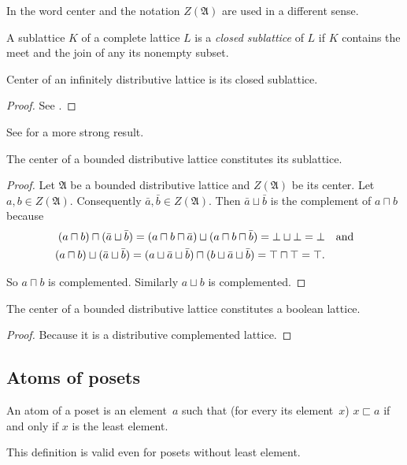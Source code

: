 \begin{rem}
In \cite{ADTCGSBVA} the word center and the notation $Z(\mathfrak{A})$
are used in a different sense.\end{rem}
\begin{defn}
A sublattice $K$ of a complete lattice
$L$ is a \emph{closed sublattice} of $L$ if $K$ contains the meet
and the join of any its nonempty subset.\end{defn}
\begin{thm}
Center of an infinitely distributive lattice is its closed sublattice.\end{thm}
\begin{proof}
See \cite{center-inf-distr}.\end{proof}
\begin{rem}
See \cite{center-complete} for a more strong result.\end{rem}
\begin{thm}
The center of a bounded distributive lattice constitutes its sublattice.\end{thm}
\begin{proof}
Let $\mathfrak{A}$ be a bounded distributive lattice and $Z(\mathfrak{A})$
be its center. Let $a,b\in Z(\mathfrak{A})$. Consequently $\bar{a},\bar{b}\in Z(\mathfrak{A})$.
Then $\bar{a}\sqcup\bar{b}$ is the complement of $a\sqcap b$ because
\begin{align*}
(a\sqcap b)\sqcap(\bar{a}\sqcup\bar{b})=(a\sqcap b\sqcap\bar{a})\sqcup(a\sqcap b\sqcap\bar{b})=\bot\sqcup\bot=\bot & \text{\quad and}\\
(a\sqcap b)\sqcup(\bar{a}\sqcup\bar{b})=(a\sqcup\bar{a}\sqcup\bar{b})\sqcap(b\sqcup{\bar{a}\sqcup\bar{b}})=\top\sqcap\top=\top.
\end{align*}


So $a\sqcap b$ is complemented. Similarly $a\sqcup b$ is complemented.\end{proof}
\begin{thm}
\label{centr-bool}The center of a bounded distributive lattice constitutes
a boolean lattice.\end{thm}
\begin{proof}
Because it is a distributive complemented lattice.
\end{proof}

\subsection{Atoms of posets}\label{sec-common-atoms}
\begin{defn}
An atom of a poset is an element~$a$ such that (for every its element~$x$)
$x\sqsubset a$ if and only if $x$ is the least element.\end{defn}
\begin{rem}
This definition is valid even for posets without least element.
\end{rem}


